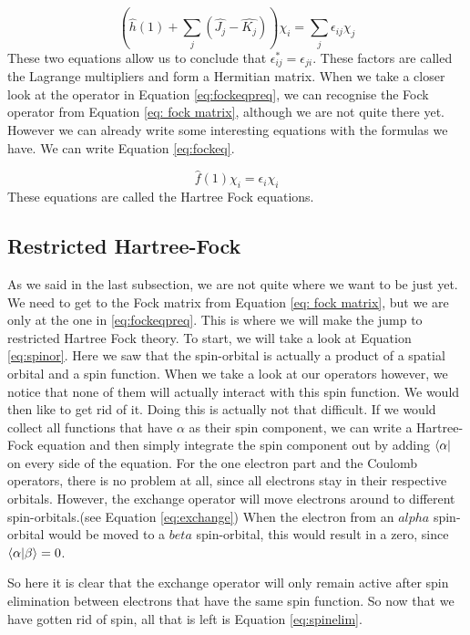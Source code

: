 \begin{equation}\label{eq:fockeqpreq}
    \left(\hat{h}(1) + \sum_j(\hat{J_j} - \hat{K_j})\right)\chi_i = \sum_{j}\epsilon_{ij}\chi_j
\end{equation}
These two equations allow us to conclude that $\epsilon^*_{ij} = \epsilon_{ji}$.
These factors are called the Lagrange multipliers and form a Hermitian matrix. 
When we take a closer look at the operator in Equation \ref{eq:fockeqpreq}, we 
can recognise the Fock operator from Equation \ref{eq: fock matrix}, although
we are not quite there yet. However we can already write some interesting equations
with the formulas we have. We can write Equation \ref{eq:fockeq}.

\begin{equation}\label{eq:fockeq}
    \hat{f}(1)\chi_i = \epsilon_i\chi_i
\end{equation}
These equations are called the Hartree Fock equations.
\subsection{Restricted Hartree-Fock}
\label{subsec:RHF}
As we said in the last subsection, we are not quite where we want to be just yet.
We need to get to the Fock matrix from Equation \ref{eq: fock matrix}, but we are
only at the one in \ref{eq:fockeqpreq}. This is where we will make the jump to
restricted Hartree Fock theory. To start, we will take a look at Equation \ref{eq:spinor}.
Here we saw that the spin-orbital is actually a product of a spatial orbital and
a spin function. When we take a look at our operators however, we notice that none
of them will actually interact with this spin function. We would then like to get rid
of it. Doing this is actually not that difficult. If we would collect all functions
that have $\alpha$ as their spin component, we can write a Hartree-Fock equation and
then simply integrate the spin component out by adding $\bra{\alpha}$ on every
side of the equation. For the one electron part and the Coulomb operators, there is
no problem at all, since all electrons stay in their respective orbitals. However,
the exchange operator will move electrons around to different spin-orbitals.(see 
Equation \ref{eq:exchange}) When the electron from an $alpha$ spin-orbital would
be moved to a $beta$ spin-orbital, this would result in a zero, since $\bra{\alpha}\ket{\beta} = 0$.

So here it is clear that the exchange operator will only remain active after spin 
elimination between electrons that have the same spin function. So now that we have
gotten rid of spin, all that is left is Equation \ref{eq:spinelim}.

